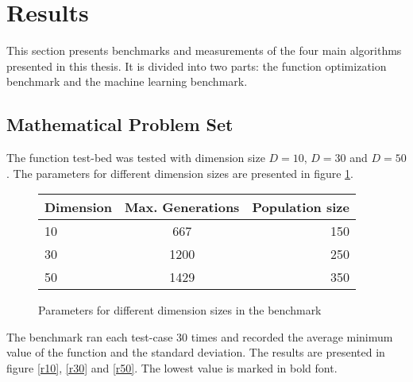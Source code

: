 \section{Results}

This section presents benchmarks and measurements of the four main algorithms presented in this thesis. It is divided into two parts: the function optimization benchmark and the machine learning benchmark.

\subsection{Mathematical Problem Set}

The function test-bed was tested with dimension size $D=10$, $D=30$ and $D=50$. The parameters for different dimension sizes are presented in figure \ref{t1}.

\begin{figure}[H]
  \centering
  \begin{center}
    \begin{tabular}{ | l | c | r | }
      \hline
      Dimension & Max. Generations & Population size \\ \hline
      10 & 667 & 150 \\ \hline
      30 & 1200 & 250 \\ \hline
      50 & 1429 & 350 \\
      \hline
    \end{tabular}
  \end{center}
  \caption{Parameters for different dimension sizes in the benchmark}
  \label{t1}
\end{figure}

The benchmark ran each test-case 30 times and recorded the average minimum value of the function and the standard deviation. The results are presented in figure \ref{r10}, \ref{r30} and \ref{r50}. The lowest value is marked in bold font.




